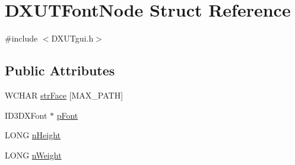 \hypertarget{struct_d_x_u_t_font_node}{
\section{DXUTFontNode Struct Reference}
\label{struct_d_x_u_t_font_node}
}


{\ttfamily \#include $<$DXUTgui.h$>$}\subsection*{Public Attributes}
\begin{DoxyCompactItemize}
\item 
WCHAR \hyperlink{struct_d_x_u_t_font_node_a38271d76ed025e34ad12db38f3cef3bf}{strFace} \mbox{[}MAX\_\-PATH\mbox{]}
\item 
ID3DXFont $\ast$ \hyperlink{struct_d_x_u_t_font_node_a73dd1fc4093cc67b42024a60d13a032c}{pFont}
\item 
LONG \hyperlink{struct_d_x_u_t_font_node_a6da65186d482f93c31e2432eed789f0f}{nHeight}
\item 
LONG \hyperlink{struct_d_x_u_t_font_node_a7748eaafd54d1dc428c6f350d1adc725}{nWeight}
\end{DoxyCompactItemize}


